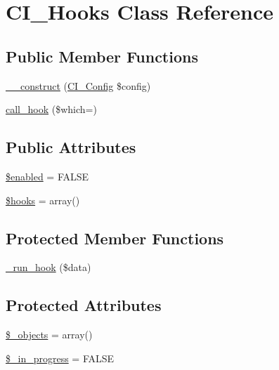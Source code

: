 \hypertarget{class_c_i___hooks}{}\section{C\+I\+\_\+\+Hooks Class Reference}
\label{class_c_i___hooks}
\subsection*{Public Member Functions}
\begin{DoxyCompactItemize}
\item 
\mbox{\hyperlink{class_c_i___hooks_ab7da97fbbffcd188093b4674ef948335}{\+\_\+\+\_\+construct}} (\mbox{\hyperlink{class_c_i___config}{C\+I\+\_\+\+Config}} \$config)
\item 
\mbox{\hyperlink{class_c_i___hooks_a470d397aaf24f1ca3ef73021ad03492b}{call\+\_\+hook}} (\$which=\textquotesingle{}\textquotesingle{})
\end{DoxyCompactItemize}
\subsection*{Public Attributes}
\begin{DoxyCompactItemize}
\item 
\mbox{\hyperlink{class_c_i___hooks_a8d376199cc641e3e7af6e1a0d5c736d9}{\$enabled}} = F\+A\+L\+SE
\item 
\mbox{\hyperlink{class_c_i___hooks_a05aec88c3516c6db5da524fbcc673aff}{\$hooks}} = array()
\end{DoxyCompactItemize}
\subsection*{Protected Member Functions}
\begin{DoxyCompactItemize}
\item 
\mbox{\hyperlink{class_c_i___hooks_a2cd07b3fcfaf153a37f164d3fbc7c3d9}{\+\_\+run\+\_\+hook}} (\$data)
\end{DoxyCompactItemize}
\subsection*{Protected Attributes}
\begin{DoxyCompactItemize}
\item 
\mbox{\hyperlink{class_c_i___hooks_a7f925b11c74f8a8aa0d4627c6f7844ce}{\$\+\_\+objects}} = array()
\item 
\mbox{\hyperlink{class_c_i___hooks_a6e8d0edcf7a4fb3e76c0f6d00e70053e}{\$\+\_\+in\+\_\+progress}} = F\+A\+L\+SE
\end{DoxyCompactItemize}


